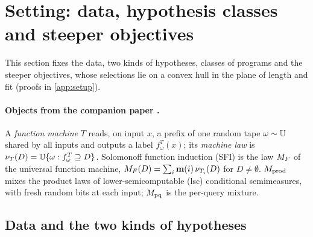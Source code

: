 \section{Setting: data, hypothesis classes and steeper objectives}\label{sec:setup}

This section fixes the data, two kinds of hypotheses, classes of programs and the steeper objectives, whose selections lie on a convex hull in the plane of length and fit (proofs in \cref{app:setup}).

\paragraph{Objects from the companion paper \citep{claudeSFI2026fundamentals}.}
A \emph{function machine} $T$ reads, on input $x$, a prefix of one random tape $\omega\sim\mathbb{U}$ shared by all inputs and outputs a label $f^T_\omega(x)$; its \emph{machine law} is $\nu_T(D)=\mathbb{U}\{\omega:f^T_\omega\supseteq D\}$. Solomonoff function induction (SFI) is the law $M_{F}$ of the universal function machine, $M_{F}(D)=\sum_i\mathbf{m}(i)\,\nu_{T_i}(D)$ for $D\ne\emptyset$. $M_{\mathrm{prod}}$ mixes the product laws of lower-semicomputable (lsc) conditional semimeasures, with fresh random bits at each input; $M_{\mathrm{pq}}$ is the per-query mixture.

\subsection{Data and the two kinds of hypotheses}\label{sec:setup:hyp}

